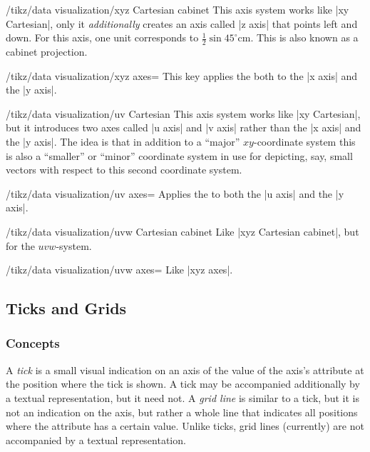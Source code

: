 \begin{key}{/tikz/data visualization/xyz Cartesian cabinet}
    This axis system works like |xy Cartesian|, only it \emph{additionally}
    creates an axis called |z axis| that points left and down. For this axis,
    one unit corresponds to $\frac{1}{2}\sin 45^\circ\mathrm{cm}$. This is also
    known as a cabinet projection.

    \begin{key}{/tikz/data visualization/xyz axes=}
        This key applies the  both to the |x axis| and the
        |y axis|.
    \end{key}
\end{key}

\begin{key}{/tikz/data visualization/uv Cartesian}
    This axis system works like |xy Cartesian|, but it introduces two axes
    called |u axis| and |v axis| rather than the |x axis| and the |y axis|. The
    idea is that in addition to a ``major'' $xy$-coordinate system this is also
    a ``smaller'' or ``minor'' coordinate system in use for depicting, say,
    small vectors with respect to this second coordinate system.

    \begin{key}{/tikz/data visualization/uv axes=}
        Applies the  to both the |u axis| and the |y axis|.
    \end{key}
\end{key}

\begin{key}{/tikz/data visualization/uvw Cartesian cabinet}
    Like |xyz Cartesian cabinet|, but for the $uvw$-system.

    \begin{key}{/tikz/data visualization/uvw axes=}
        Like |xyz axes|.
    \end{key}
\end{key}


\subsection{Ticks and Grids}
\label{section-dv-ticks-and-grids}

\subsubsection{Concepts}

A \emph{tick} is a small visual indication on an axis of the value of the
axis's attribute at the position where the tick is shown. A tick may be
accompanied additionally by a textual representation, but it need not. A
\emph{grid line} is similar to a tick, but it is not an indication on the axis,
but rather a whole line that indicates all positions where the attribute has a
certain value. Unlike ticks, grid lines (currently) are not accompanied by a
textual representation.

